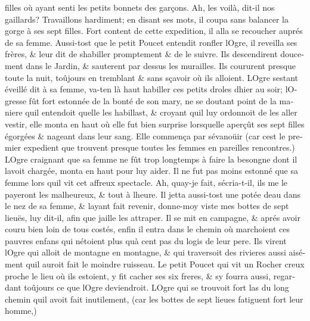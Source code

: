 \documentclass[14pt,a4paper]{memoir}
\begin{document}
\begin{otherlanguage}{french}
filles où ayant senti les petits bonnets des garçons. Ah, les voilà,
dit-il nos gaillards? Travaillons hardiment; en disant ses mots, il
coupa sans balancer la gorge à ses sept filles. Fort content de cette
expedition, il alla se recoucher auprés de sa femme. Aussi-tost que le
petit Poucet entendit ronfler l\textquotesingle Ogre, il reveilla ses
frères, \& leur dit de s\textquotesingle habiller promptement \& de le
suivre. Ils descendirent doucement dans le Jardin, \& sauterent par
dessus les murailles. Ils coururent presque toute la nuit, toûjours en
tremblant \& sans sçavoir où ils alloient. L\textquotesingle Ogre
s\textquotesingle estant éveillé dit à sa femme, va-t\textquotesingle en
là haut habiller ces petits droles d\textquotesingle hier au soir;
l\textquotesingle Ogresse fût fort estonnée de la bonté de son mary, ne
se doutant point de la maniere qu\textquotesingle il entendoit
qu\textquotesingle elle les habillast, \& croyant qu\textquotesingle il
luy ordonnoit de les aller vestir, elle monta en haut où elle fut bien
surprise lorsqu\textquotesingle elle aperçût ses sept filles égorgées \&
nageant dans leur sang. Elle commença par s\textquotesingle évanoüir
(car c\textquotesingle est le premier expedient que trouvent presque
toutes les femmes en pareilles rencontres.) L\textquotesingle Ogre
craignant que sa femme ne fût trop longtemps à faire la besongne dont il
l\textquotesingle avoit chargée, monta en haut pour luy aider. Il ne fut
pas moins estonné que sa femme lors qu\textquotesingle il vit cet
affreux spectacle. Ah, qu\textquotesingle ay-je fait,
s\textquotesingle écria-t-il, ils me le payeront les malheureux, \& tout
à l\textquotesingle heure. Il jetta aussi-tost une potée
d\textquotesingle eau dans le nez de sa femme, \&
l\textquotesingle ayant fait revenir, donne-moy viste mes bottes de sept
lieuës, luy dit-il, afin que j\textquotesingle aille les attraper. Il se
mit en campagne, \& aprés avoir couru bien loin de tous costés, enfin il
entra dans le chemin où marchoient ces pauvres enfans qui
n\textquotesingle étoient plus qu\textquotesingle à cent pas du logis de
leur pere. Ils virent l\textquotesingle Ogre qui alloit de montagne en
montagne, \& qui traversoit des rivieres aussi aisément
qu\textquotesingle il auroit fait le moindre ruisseau. Le petit Poucet
qui vit un Rocher creux proche le lieu où ils estoient, y fit cacher ses
six freres, \& s\textquotesingle y fourra aussi, regardant toûjours ce
que l\textquotesingle Ogre deviendroit. L\textquotesingle Ogre qui se
trouvoit fort las du long chemin qu\textquotesingle il avoit fait
inutilement, (car les bottes de sept lieues fatiguent fort leur homme,)

\end{otherlanguage}
\end{document}
